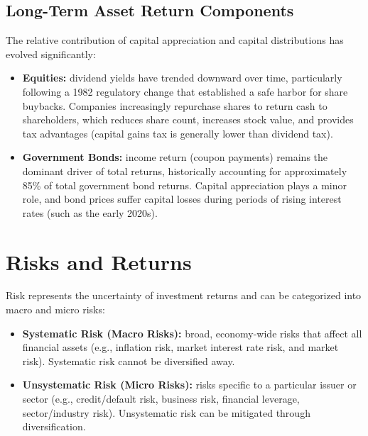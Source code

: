 \subsection{Long-Term Asset Return Components}
	\label{subsec:Long-Term Asset Return Components}
The relative contribution of capital appreciation and capital distributions has evolved significantly:
\begin{itemize}
	\item \textbf{Equities:} dividend yields have trended downward over time, particularly following a 1982 regulatory change that established a safe harbor for share buybacks. Companies increasingly repurchase shares to return cash to shareholders, which reduces share count, increases stock value, and provides tax advantages (capital gains tax is generally lower than dividend tax).
	\item \textbf{Government Bonds:} income return (coupon payments) remains the dominant driver of total returns, historically accounting for approximately 85\% of total government bond returns. Capital appreciation plays a minor role, and bond prices suffer capital losses during periods of rising interest rates (such as the early 2020s).
\end{itemize}


\section{Risks and Returns}
\label{sec:Risks and Returns}


Risk represents the uncertainty of investment returns and can be categorized into macro and micro risks:
\begin{itemize}
	\item \textbf{Systematic Risk (Macro Risks):} broad, economy-wide risks that affect all financial assets (e.g., inflation risk, market interest rate risk, and market risk). Systematic risk cannot be diversified away.
	\item \textbf{Unsystematic Risk (Micro Risks):} risks specific to a particular issuer or sector (e.g., credit/default risk, business risk, financial leverage, sector/industry risk). Unsystematic risk can be mitigated through diversification.
\end{itemize}

